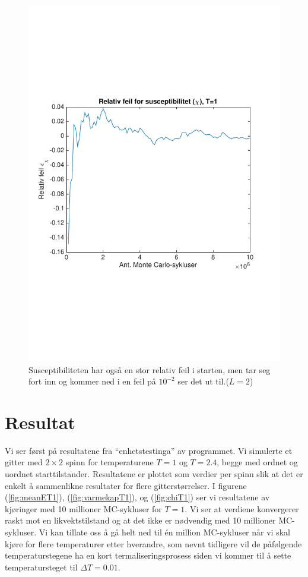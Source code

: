 \documentclass[norsk, 10pt]{article}
\begin{document}
\begin{figure}[H]
\centering
\includegraphics[scale = 0.5, trim = 1cm 8cm 1cm 8cm]{b_rel_err_chi_L2_T1.pdf}
\caption{Susceptibiliteten har også en stor relativ feil i starten, men tar seg fort inn og kommer ned i en feil på $10^{-2}$ ser det ut til.($L=2$)}
\label{fig:errchiT1L2}
\end{figure}

\section*{Resultat}
Vi ser først på resultatene fra ``enhetstestinga'' av programmet. Vi simulerte et gitter med $2\times2$ spinn for temperaturene $T=1$ og $T=2.4$, begge med ordnet og uordnet starttilstander. Resultatene er plottet som verdier per spinn slik at det er enkelt å sammenlikne resultater for flere gitterstørrelser. I figurene (\ref{fig:meanET1}), (\ref{fig:varmekapT1}), og (\ref{fig:chiT1}) ser vi resultatene av kjøringer med 10 millioner MC-sykluser for $T=1$. Vi ser at verdiene konvergerer raskt mot en likvektstilstand og at det ikke er nødvendig med 10 millioner MC-sykluser. Vi kan tillate oss å gå helt ned til én million MC-sykluser når vi skal kjøre for flere temperaturer etter hverandre, som nevnt tidligere vil de påfølgende temperaturstegene ha en kort termaliseringsprosess siden vi kommer til å sette temperatursteget til $\Delta T = 0.01$.
\end{document}
